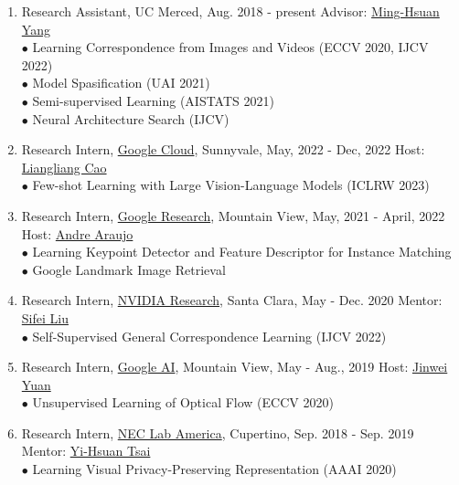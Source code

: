 \documentclass[letterpaper]{article}
\begin{document}
\begin{enumerate}

\item Research Assistant, UC Merced, Aug. 2018 - present \hfill Advisor: \href{http://faculty.ucmerced.edu/mhyang/}{Ming-Hsuan Yang}\\
	$\bullet$ Learning Correspondence from Images and Videos (ECCV 2020, IJCV 2022) \\
	$\bullet$ Model Spasification (UAI 2021) \\
	$\bullet$ Semi-supervised Learning (AISTATS 2021) \\
	$\bullet$ Neural Architecture Search (IJCV)
	
\item Research Intern, \href{https://cloud.google.com/products/ai}{Google Cloud}, Sunnyvale, May, 2022 - Dec, 2022 \hfill Host: \href{http://llcao.net/}{Liangliang Cao} \\
	$\bullet$ Few-shot Learning with Large Vision-Language Models (ICLRW 2023)

\item Research Intern, \href{https://research.google}{Google Research}, Mountain View, May, 2021 - April, 2022 \hfill Host: \href{https://andrefaraujo.github.io/}{Andre Araujo} \\
	$\bullet$ Learning Keypoint Detector and Feature Descriptor for Instance Matching \\
	$\bullet$ Google Landmark Image Retrieval
	
\item Research Intern, \href{https://www.nvidia.com/en-us/research/}{NVIDIA Research}, Santa Clara, May - Dec. 2020 \hfill Mentor: \href{https://www.sifeiliu.net/}{Sifei Liu}\\
	$\bullet$ Self-Supervised General Correspondence Learning (IJCV 2022)

\item Research Intern, \href{https://ai.google/}{Google AI}, Mountain View, May - Aug., 2019 \hfill Host: \href{mailto:jinwei@google.com}{Jinwei Yuan}\\
	$\bullet$ Unsupervised Learning of Optical Flow (ECCV 2020)

\item Research Intern, \href{https://www.nec-labs.com//}{NEC Lab America}, Cupertino, Sep. 2018 - Sep. 2019 \hfill Mentor: \href{https://sites.google.com/site/yihsuantsai/}{Yi-Hsuan Tsai} \\
 	$\bullet$ Learning Visual Privacy-Preserving Representation (AAAI 2020)


\end{enumerate}
\end{document}
